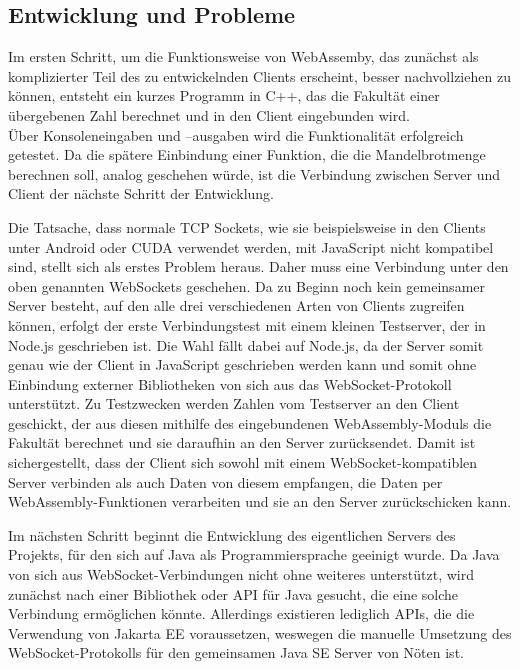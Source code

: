 \documentclass[12pt, onecolumn, notitlepage]{scrartcl}
\begin{document}
\subsection{Entwicklung und Probleme}
Im ersten Schritt, um die Funktionsweise von WebAssemby, das zunächst als komplizierter Teil des zu entwickelnden Clients erscheint, besser nachvollziehen zu können, entsteht ein kurzes Programm in C++, das die Fakultät einer übergebenen Zahl berechnet und in den Client eingebunden wird. \\
Über Konsoleneingaben und –ausgaben wird die Funktionalität erfolgreich getestet. Da die spätere Einbindung einer Funktion, die die Mandelbrotmenge berechnen soll, analog geschehen würde, ist die Verbindung zwischen Server und Client der nächste Schritt der Entwicklung. \par
Die Tatsache, dass normale TCP Sockets, wie sie beispielsweise in den Clients unter Android oder CUDA verwendet werden, mit JavaScript nicht kompatibel sind, stellt sich als erstes Problem heraus. Daher muss eine Verbindung unter den oben genannten WebSockets geschehen. Da zu Beginn noch kein gemeinsamer Server besteht, auf den alle drei verschiedenen Arten von Clients zugreifen können, erfolgt der erste Verbindungstest mit einem kleinen Testserver, der in Node.js geschrieben ist. Die Wahl fällt dabei auf Node.js, da der Server somit genau wie der Client in JavaScript geschrieben werden kann und somit ohne Einbindung externer Bibliotheken von sich aus das WebSocket-Protokoll unterstützt. Zu Testzwecken werden Zahlen vom Testserver an den Client geschickt, der aus diesen mithilfe des eingebundenen WebAssembly-Moduls die Fakultät berechnet und sie daraufhin an den Server zurücksendet. Damit ist sichergestellt, dass der Client sich sowohl mit einem WebSocket-kompatiblen Server verbinden als auch Daten von diesem empfangen, die Daten per WebAssembly-Funktionen verarbeiten und sie an den Server zurückschicken kann. \par

Im nächsten Schritt beginnt die Entwicklung des eigentlichen Servers des Projekts, für den sich auf Java als Programmiersprache geeinigt wurde. Da Java von sich aus WebSocket-Verbindungen nicht ohne weiteres unterstützt, wird zunächst nach einer Bibliothek oder API für Java gesucht, die eine solche Verbindung ermöglichen könnte. Allerdings existieren lediglich APIs, die die Verwendung von Jakarta EE voraussetzen, weswegen die manuelle Umsetzung des WebSocket-Protokolls für den gemeinsamen Java SE Server von Nöten ist. \par
\end{document}
